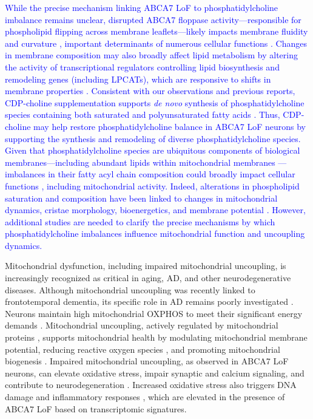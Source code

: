 \documentclass[12pt]{article}
\begin{document}
\newcommand{\quoteI}{\textcolor{blue}{While the precise mechanism linking ABCA7 LoF to phosphatidylcholine imbalance remains unclear, disrupted ABCA7 floppase activity—responsible for phospholipid flipping across membrane leaflets—likely impacts membrane fluidity and curvature \cite{Takada2018-ce,Renne2018-fc}, important determinants of numerous cellular functions \cite{McMahon2015-gy,Yang2024-tz}. Changes in membrane composition may also broadly affect lipid metabolism by altering the activity of transcriptional regulators controlling lipid biosynthesis and remodeling genes (including LPCATs), which are responsive to shifts in membrane properties \cite{Ballweg2020-rv,Covino2018-hz}. Consistent with our observations and previous reports, CDP-choline supplementation supports \textit{de novo} synthesis of phosphatidylcholine species containing both saturated and polyunsaturated fatty acids \cite{Boumann2003-im}. Thus, CDP-choline may help restore phosphatidylcholine balance in ABCA7 LoF neurons by supporting the synthesis and remodeling of diverse phosphatidylcholine species. Given that phosphatidylcholine species are ubiquitous components of biological membranes—including abundant lipids within mitochondrial membranes \cite{Decker2024-ae}—imbalances in their fatty acyl chain composition could broadly impact cellular functions \cite{Wang2019-om,Van_der_Veen2017-ei}, including mitochondrial activity. Indeed, alterations in phospholipid saturation and composition have been linked to changes in mitochondrial dynamics, cristae morphology, bioenergetics, and membrane potential \cite{Decker2024-ae,Adachi2016-tg}. However, additional studies are needed to clarify the precise mechanisms by which phosphatidylcholine imbalances influence mitochondrial function and uncoupling dynamics.\label{quoteI-label}}} 
\quoteI

Mitochondrial dysfunction, including impaired mitochondrial uncoupling, is increasingly recognized as critical in aging, AD, and other neurodegenerative diseases. Although mitochondrial uncoupling was recently linked to frontotemporal dementia, its specific role in AD remains poorly investigated \cite{Bano2023-qz,Zong2024-tn,Demine2019-qj,Picca2023-gt}. Neurons maintain high mitochondrial OXPHOS to meet their significant energy demands \cite{Morant-Ferrando2023-va,Trigo2022-ym}. Mitochondrial uncoupling, actively regulated by mitochondrial proteins \cite{Park2023-fa,}, supports mitochondrial health by modulating mitochondrial membrane potential, reducing reactive oxygen species \cite{Demine2019-qj,Shadel2015-kt}, and promoting mitochondrial biogenesis \cite{Korshunov1997-aj,Wisloff2005-ho,Andrews2005-yy,}. Impaired mitochondrial uncoupling, as observed in ABCA7 LoF neurons, can elevate oxidative stress, impair synaptic and calcium signaling, and contribute to neurodegeneration \cite{Korshunov1997-aj,Wisloff2005-ho,Andrews2005-yy,}. Increased oxidative stress also triggers DNA damage and inflammatory responses \cite{Robert2020-sc,Volanti2002-mc,Canty1999-oj,Schreck1992-zr}, which are elevated in the presence of ABCA7 LoF based on transcriptomic signatures.
\end{document}
